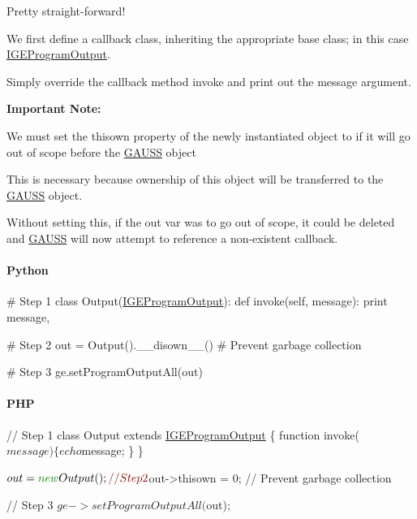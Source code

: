 Pretty straight-\/forward!

We first define a callback class, inheriting the appropriate base class; in this case \hyperlink{class_i_g_e_program_output}{I\+G\+E\+Program\+Output}.

Simply override the callback method {\ttfamily invoke} and print out the {\ttfamily message} argument.

{\bfseries Important Note\+:}

We must set the {\ttfamily thisown} property of the newly instantiated object to {} if it will go out of scope before the {\ttfamily \hyperlink{class_g_a_u_s_s}{G\+A\+U\+SS}} object

This is necessary because ownership of this object will be transferred to the \hyperlink{class_g_a_u_s_s}{G\+A\+U\+SS} object.

Without setting this, if the {\ttfamily out} var was to go out of scope, it could be deleted and \hyperlink{class_g_a_u_s_s}{G\+A\+U\+SS} will now attempt to reference a non-\/existent callback.

\paragraph*{Python}


\begin{DoxyCode}
\textcolor{comment}{# Step 1}
\textcolor{keyword}{class }Output(\hyperlink{class_i_g_e_program_output}{IGEProgramOutput}):
    \textcolor{keyword}{def }invoke(self, message):
        \textcolor{keywordflow}{print} message,

\textcolor{comment}{# Step 2}
out = Output().\_\_disown\_\_() \textcolor{comment}{# Prevent garbage collection}

\textcolor{comment}{# Step 3}
ge.setProgramOutputAll(out)
\end{DoxyCode}


\paragraph*{P\+HP}


\begin{DoxyCode}
\textcolor{comment}{// Step 1}
\textcolor{keyword}{class }Output \textcolor{keyword}{extends} \hyperlink{class_i_g_e_program_output}{IGEProgramOutput} \{
    \textcolor{keyword}{function} invoke($message) \{
        echo $message;
    \}
\}

$out = \textcolor{keyword}{new} Output();

\textcolor{comment}{// Step 2}
$out->thisown = 0; \textcolor{comment}{// Prevent garbage collection}

\textcolor{comment}{// Step 3}
$ge->setProgramOutputAll($out);
\end{DoxyCode}


